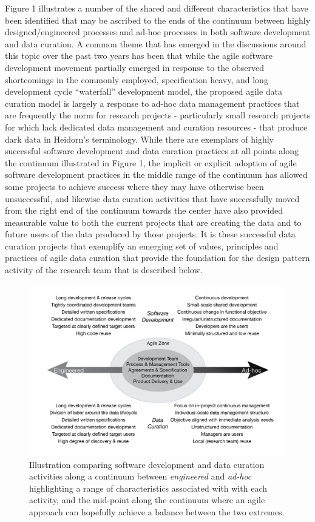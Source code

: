 \documentclass[paper]{ijdc-v9}
\begin{document}
Figure 1 illustrates a number of the shared and different
characteristics that have been identified that may be ascribed to the
ends of the continuum between highly designed/engineered processes and
ad-hoc processes in both software development and data curation. A
common theme that has emerged in the discussions around this topic over
the past two years has been that while the agile software development
movement partially emerged in response to the observed shortcomings in
the commonly employed, specification heavy, and long development cycle
``waterfall'' development model, the proposed agile data curation model
is largely a response to ad-hoc data management practices that are
frequently the norm for research projects - particularly small research
projects for which lack dedicated data management and curation resources
- that produce dark data in Heidorn's \autocite*{heidorn_shedding_2008}
terminology. While there are exemplars of highly successful software
development and data curation practices at all points along the
continuum illustrated in Figure 1, the implicit or explicit adoption of
agile software development practices in the middle range of the
continuum has allowed some projects to achieve success where they may
have otherwise been unsuccessful, and likewise data curation activities
that have successfully moved from the right end of the continuum towards
the center have also provided measurable value to both the current
projects that are creating the data and to future users of the data
produced by those projects. It is these successful data curation
projects that exemplify an emerging set of values, principles and
practices of agile data curation that provide the foundation for the
design pattern activity of the research team that is described below.

\begin{figure}
\centering
\includegraphics{agileComparison-01.png}
\caption{Illustration comparing software development and data curation
activities along a continuum between \emph{engineered} and \emph{ad-hoc}
highlighting a range of characteristics associated with with each
activity, and the mid-point along the continuum where an agile approach
can hopefully achieve a balance between the two extremes.}
\end{figure}
\end{document}
